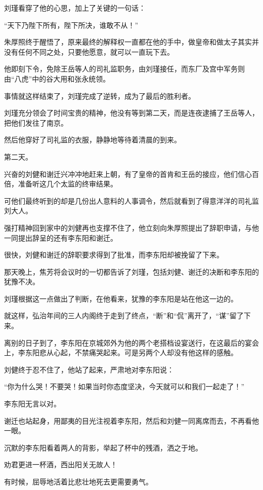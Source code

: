 \begin{multicols}{\theparacolNo}
刘瑾看穿了他的心思，加上了关键的一句话：

“天下乃陛下所有，陛下所决，谁敢不从！”

朱厚照终于醒悟了，原来最终的解释权一直都在他的手中，做皇帝和做太子其实并没有任何不同之处，只要他愿意，就可以一直玩下去。

他即刻下令，免除王岳等人的司礼监职务，由刘瑾接任，而东厂及宫中军务则由“八虎”中的谷大用和张永统领。

事情就这样结束了，刘瑾完成了逆转，成为了最后的胜利者。

刘瑾充分领会了时间宝贵的精神，他没有等到第二天，而是连夜逮捕了王岳等人，把他们发往了南京。

然后他穿好了司礼监的衣服，静静地等待着清晨的到来。

第二天。

兴奋的刘健和谢迁兴冲冲地赶来上朝，有了皇帝的首肯和王岳的接应，他们信心百倍，准备听这几个太监的终审结果。

可他们最终听到的却是几份出人意料的人事调令，然后就看到了得意洋洋的司礼监刘大人。

强打精神回到家中的刘健再也支撑不住了，他立刻向朱厚照提出了辞职申请，与他一同提出辞呈的还有李东阳和谢迁。

很快，刘健和谢迁的辞职要求得到了批准，而李东阳却被挽留了下来。

那天晚上，焦芳将会议时的一切都告诉了刘瑾，包括刘健、谢迁的决断和李东阳的犹豫不决。

刘瑾根据这一点做出了判断，在他看来，犹豫的李东阳是站在他这一边的。

就这样，弘治年间的三人内阁终于走到了终点，“断”和“侃”离开了，“谋”留了下来。

离别的日子到了，李东阳在京城郊外为他的两个老搭档设宴送行，在这最后的宴会上，李东阳悲从心起，不禁痛哭起来。可是另两个人却没有他这样的感触。

刘健终于忍不住了，他站了起来，严肃地对李东阳说：

“你为什么哭！不要哭！如果当时你态度坚决，今天就可以和我们一起走了！”

李东阳无言以对。

谢迁也站起身，用鄙夷的目光注视着李东阳，然后和刘健一同离席而去，不再看他一眼。

沉默的李东阳看着两人的背影，举起了杯中的残酒，洒之于地。

劝君更进一杯酒，西出阳关无故人！

有时候，屈辱地活着比悲壮地死去更需要勇气。
\ifnum{}
	\end{multicols}
\fi
\newpage
